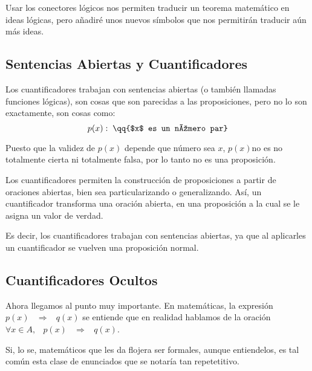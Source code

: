 \documentclass[12pt, fleqn]{report}                             %
\newcommand \Quote              {\qq}                           %
\DeclareMathOperator \Space     {\quad}                         %
\DeclareMathOperator \MiniSpace {\;}                            %
\theoremstyle{break}                                            %
\newcommand \lInfire {\MiniSpace \Rightarrow \MiniSpace}        %
\begin{document}
            Usar los conectores lógicos nos permiten traducir un teorema matemático en ideas lógicas, pero
            añadiré unos nuevos símbolos que nos permitirán traducir aún más ideas.


            \subsection{Sentencias Abiertas y Cuantificadores}

                Los cuantificadores trabajan con sentencias abiertas (o también llamadas funciones lógicas),
                son cosas que son parecidas a las proposiciones, pero no lo son exactamente, son cosas como:
                \begin{equation*}
                    p(x): \; \text{\Quote{$x$ es un número par}}  
                \end{equation*}

                Puesto que la validez de $p(x)$ depende que número sea $x$, $p(x)$no es no
                totalmente cierta ni totalmente falsa, por lo tanto no es una proposición.

                Los cuantificadores permiten la construcción de proposiciones a partir de oraciones abiertas,
                bien sea particularizando o generalizando. Así, un cuantificador transforma una oración abierta,
                en una proposición a la cual se le asigna un valor de verdad.

                Es decir, los cuantificadores trabajan con sentencias abiertas, ya que al aplicarles un
                cuantificador se vuelven una proposición normal.

            \subsection{Cuantificadores Ocultos}
                Ahora llegamos al punto muy importante. En matemáticas, la expresión $p(x) \lInfire q(x)$
                se entiende que en realidad hablamos de la oración $\forall x \in A, \MiniSpace p(x) \lInfire q(x)$.

                Si, lo se, matemáticos que les da flojera ser formales, aunque entiendelos, es tal común esta
                clase de enunciados que se notaría tan repetetitivo.
\end{document}
